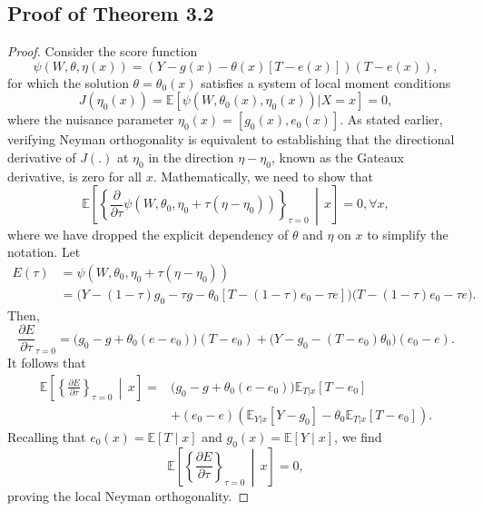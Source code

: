 \documentclass[sigconf]{acmart}
\theoremstyle{plain}
\numberwithin{equation}{section}
\begin{document}
\subsection{Proof of Theorem 3.2}
\begin{proof}
Consider the score function
\begin{equation*}
\psi\left(W,\theta,\eta(x)\right) = \left(Y - g(x) - \theta(x)[T-e(x)]\right) \left(T-e(x)\right),
\end{equation*}
for which the solution $\theta = \theta_0(x)$ satisfies a system of local moment conditions
\begin{equation*}
J(\eta_0(x)) = \mathbb{E}\left[\psi\left(W,\theta_0(x),\eta_0(x)\right) | X=x\right] = 0,
\end{equation*}
where the nuisance parameter $\eta_0(x) = [g_0(x), e_0(x)]$. As stated earlier, verifying Neyman orthogonality is equivalent to establishing that the directional derivative of $J(.)$ at $\eta_0$ in the direction $\eta-\eta_0$, known as the Gateaux derivative, is zero for all $x$. Mathematically, we need to show that
\begin{equation*}
\mathbb{E}\left[\left\{\frac{\partial}{\partial \tau} \psi\left(W,\theta_0,\eta_0+\tau(\eta-\eta_0)\right)\right\}_{\tau=0} \, \middle|\, x\right] =0, \forall x,
\end{equation*}
where we have dropped the explicit dependency of $\theta$ and $\eta$ on $x$ to simplify the notation.
Let 
\begin{align*}
E(\tau) &= \psi\left(W,\theta_0,\eta_0+\tau(\eta-\eta_0)\right) \\
&= \big(Y - (1-\tau)g_0 - \tau g - \theta_0[T-(1-\tau)e_0-\tau e]\big)\big(T-(1-\tau)e_0-\tau e \big).
\end{align*}
Then, $$\frac{\partial E}{\partial \tau}_{\tau = 0} = \big(g_0 - g + \theta_0(e-e_0)\big) (T-e_0) + \big(Y-g_0-(T-e_0)\theta_0\big) (e_0-e).$$  It follows that
\begin{align*}
\mathbb{E}\left[ \left\{\frac{\partial E}{\partial \tau}\right\}_{\tau = 0} \, \middle|\, x\right] = &\big(g_0 - g + \theta_0(e-e_0)\big) \mathbb{E}_{T|x} \left[T-e_0\right] \\
&+ (e_0-e) \left(\mathbb{E}_{Y|x} \left[Y-g_0\right] - \theta_0  \mathbb{E}_{T|x} \left[T-e_0\right] \right).
\end{align*}
Recalling that $e_0(x) = \mathbb{E}\left[T \mid x\right]$ and $g_0(x) = \mathbb{E}\left[Y \mid x\right]$, we find
\begin{equation*}
\mathbb{E}\left[ \left\{\frac{\partial E}{\partial \tau}\right\}_{\tau = 0} \, \middle|\, x\right] = 0,
\end{equation*}
proving the local Neyman orthogonality.
\end{proof}
\end{document}

